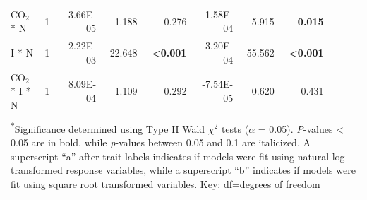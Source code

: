 \begin{landscape}
\begin{table}[]
{\begin{tabular}{p{3cm}p{0.5cm}p{1.75cm}p{1.5cm}p{1.5cm}p{1.75cm}p{1.5cm}p{1.5cm}p{1.75cm}p{1.5cm}p{1.5cm}}
            CO$_2$ * N & \multicolumn{1}{r}{1}
            & \multicolumn{1}{r}{-3.66E-05}     & \multicolumn{1}{r}{1.188}         & \multicolumn{1}{r}{0.276}
            & \multicolumn{1}{r}{1.58E-04}      & \multicolumn{1}{r}{5.915}         & \multicolumn{1}{r}{\textbf{0.015}}
            & \multicolumn{1}{r}{}              & \multicolumn{1}{r}{}              & \multicolumn{1}{r}{} 
            \\

            I * N & \multicolumn{1}{r}{1}
            & \multicolumn{1}{r}{-2.22E-03}     & \multicolumn{1}{r}{22.648}        & \multicolumn{1}{r}{\textbf{<0.001}}
            & \multicolumn{1}{r}{-3.20E-04}     & \multicolumn{1}{r}{55.562}        & \multicolumn{1}{r}{\textbf{<0.001}}
            & \multicolumn{1}{r}{}              & \multicolumn{1}{r}{}              & \multicolumn{1}{r}{} 
            \\

            CO$_2$ * I * N & \multicolumn{1}{r}{1}
            & \multicolumn{1}{r}{8.09E-04}      & \multicolumn{1}{r}{1.109}         & \multicolumn{1}{r}{0.292}
            & \multicolumn{1}{r}{-7.54E-05}     & \multicolumn{1}{r}{0.620}         & \multicolumn{1}{r}{0.431}
            & \multicolumn{1}{r}{}              & \multicolumn{1}{r}{}              & \multicolumn{1}{r}{} 
            \\
            \hline
            \\
            \multicolumn{11}{p{22.5cm}}{\textsuperscript{$*$}Significance determined using Type II Wald $\chi^{2}$ tests ($\alpha$ = 0.05). \textit{P}-values < 0.05 are in bold, while \textit{p}-values between 0.05 and 0.1 are italicized. A superscript “a” after trait labels indicates if models were fit using natural log transformed response variables, while a superscript “b” indicates if models were fit using square root transformed variables. Key: df=degrees of freedom}
    \end{tabular}}
    \label{tab:table5.4}
    \end{table}
\end{landscape}
\clearpage


